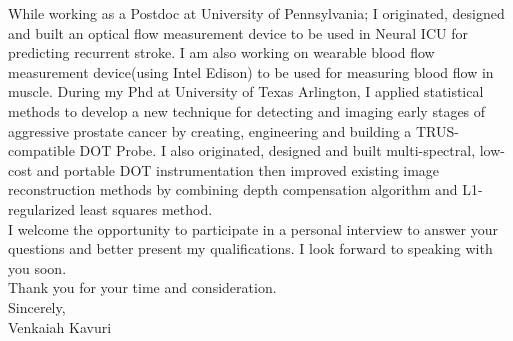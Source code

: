 \documentclass{my_cv}
\begin{document}
While working as a Postdoc at University of Pennsylvania; I originated, designed and built an optical flow measurement device to be used in Neural ICU for predicting recurrent stroke. I am also working on wearable blood flow measurement device(using Intel Edison) to be used for measuring blood flow in muscle. During my Phd at University of Texas Arlington, I applied statistical methods to develop a new technique for detecting and imaging early stages of aggressive prostate cancer by creating, engineering and building a TRUS-compatible DOT Probe. I also originated, designed and built multi-spectral, low-cost and portable DOT instrumentation then improved existing image reconstruction methods by combining depth compensation algorithm and L1-regularized least squares method.\\

\vspace{2mm} 
I welcome the opportunity to participate in a personal interview to answer your questions and better present my qualifications. I look forward to speaking with you soon.\\
\vspace{2mm} 
Thank you for your time and consideration.\\
\vspace{10mm} 
Sincerely,\\

\vspace{5mm} 
Venkaiah Kavuri\\
\end{document}
